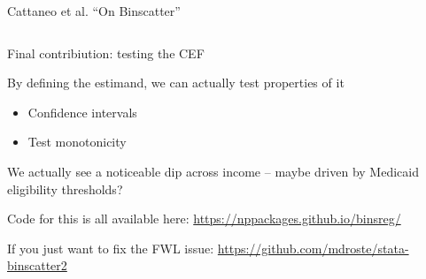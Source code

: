 \documentclass[notes,11pt, aspectratio=169]{beamer}
\newcommand\1{\operatorname{\mathbbm{1}}\indicatorfence}
\newenvironment{wideitemize}{\itemize\addtolength{\itemsep}{10pt}}{\enditemize}
\begin{document}
\begin{frame}{Cattaneo et al. ``On Binscatter''}
  \begin{columns}[T] %
    \begin{column}{.5\textwidth}
      \begin{wideitemize}
      \item Final contribiution: testing the CEF
      \item By defining the estimand, we can actually test properties
        of it
        \begin{itemize}
        \item Confidence intervals
        \item Test monotonicity
        \end{itemize}
      \item We actually see a noticeable dip across income -- maybe
        driven by Medicaid eligibility thresholds?
      \item Code for this is all available here: \url{https://nppackages.github.io/binsreg/}
      \item If you just want to fix the FWL issue: \url{https://github.com/mdroste/stata-binscatter2}
  \end{wideitemize}
  \end{column}%
  \hfill%
  \begin{column}{.5\textwidth}
  \end{column}
\end{columns}
\end{frame}
\end{document}
